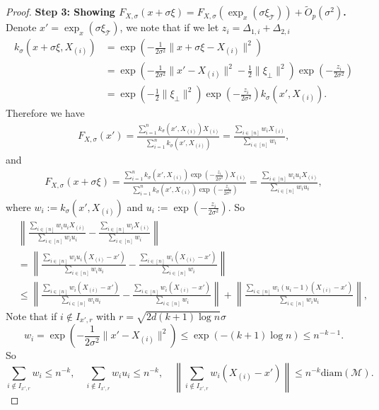 \documentclass{article}
\def\Prob{{\mathbb P}}
\def\calM{\mathcal{M}}
\begin{document}
\begin{proof}
\noindent\textbf{Step 3: Showing $F_{X,\sigma}(x+\sigma\xi)=F_{X,\sigma}(\exp_x(\sigma \xi_{\mathcal{T}}))+\widetilde{O}_p(\sigma^2)$.}
Denote $x'=\exp_x(\sigma \xi_{\mathcal{T}})$, we note that if we let $z_i=\Delta_{1,i}+\Delta_{2,i}$
\begin{align*}
k_\sigma(x+\sigma \xi, X_{(i)})&=\exp(-\frac1{2\sigma^2}\|x+\sigma\xi-X_{(i)}\|^2)\\
&=\exp(-\frac1{2\sigma^2}\|x'-X_{(i)}\|^2-\frac1{2}\|\xi_\bot\|^2)\exp(-\frac{z_i}{2\sigma^2})\\
&=\exp(-\frac1{2}\|\xi_\bot\|^2)\exp(-\frac{z_i}{2\sigma^2})k_\sigma(x', X_{(i)}).
\end{align*}
Therefore we have
\begin{align*}
F_{X, \sigma}(x')= \frac{\sum\limits_{i=1}^n k_\sigma(x', X_{(i)}) X_{(i)}}{\sum\limits_{i=1}^n k_\sigma(x', X_{(i)})}
=\frac{\sum_{i\in [n]} w_i X_{(i)}}{\sum_{i\in [n]} w_i},
\end{align*}
and 
\begin{align*}
F_{X, \sigma}(x+\sigma \xi)=
\frac{\sum\limits_{i=1}^n k_\sigma(x', X_{(i)})\exp(-\frac{z_i}{2\sigma^2}) X_{(i)}}{\sum\limits_{i=1}^n k_\sigma(x', X_{(i)})\exp(-\frac{z_i}{2\sigma^2})}
=\frac{\sum_{i\in [n]} w_iu_i X_{(i)}}{\sum_{i\in [n]} w_iu_i},
\end{align*}
where $w_i:=k_\sigma(x', X_{(i)})$ and $u_i:=\exp(-\frac{z_i}{2\sigma^2})$. 
So 
\begin{align*}
&\left\|\frac{\sum_{i\in [n]} w_iu_i X_{(i)}}{\sum_{i\in [n]} w_iu_i}-
\frac{\sum_{i\in [n]} w_i X_{(i)}}{\sum_{i\in [n]} w_i}\right\|\\
&=\left\|\frac{\sum_{i\in [n]} w_iu_i (X_{(i)}-x')}{\sum_{i\in [n]} w_iu_i}-
\frac{\sum_{i\in [n]} w_i (X_{(i)}-x')}{\sum_{i\in [n]} w_i}\right\|\\
&\leq\left\|\frac{\sum_{i\in [n]} w_i (X_{(i)}-x')}{\sum_{i\in [n]} w_iu_i}-\frac{\sum_{i\in [n]} w_i (X_{(i)}-x')}{\sum_{i\in [n]} w_i}\right\|+\left\|\frac{\sum_{i\in [n]} w_i(u_i-1) (X_{(i)}-x')}{\sum_{i\in [n]} w_iu_i}\right\|,
\end{align*}
 Note that if $i\notin I_{x',r}$ with $r=\sqrt{2d(k+1)\log n}\sigma$  
\[
w_i=\exp(-\frac{1}{2\sigma^2} \|x'-X_{(i)}\|^2)
\leq \exp(-(k+1) \log n)\leq n^{-k-1}. 
\]
So 
\[
\sum_{i\notin I_{x',r}} w_i\leq n^{-k},\quad
\sum_{i\notin I_{x',r}} w_iu_i\leq n^{-k},\quad
\left\|\sum_{i\notin I_{x',r}} w_i (X_{(i)}-x')\right\|\leq n^{-k}\text{diam}(\calM). 
\]


\end{proof}
\end{document}

